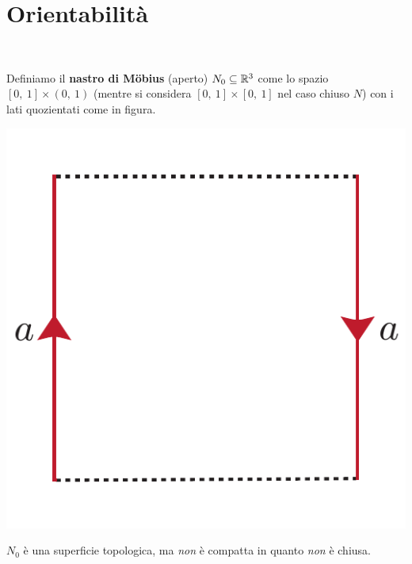 \section{Orientabilità}
\begin{define}~{}\label{nastromobius}\\
\begin{minipage}{.75\linewidth}
Definiamo il \textbf{nastro di Möbius} (aperto) $N_0\subseteq \mathbb{R}^3$ come lo spazio $\left[0,\ 1\right]\times (0,\ 1)$ (mentre si considera $\left[0,\ 1\right]\times [0,\ 1]$ nel caso chiuso $N$) con i lati quozientati come in figura.
	\end{minipage}
	\begin{minipage}{.14\linewidth}
		\begin{center}
			\includegraphics[trim=0cm 0cm 0cm 0cm, clip, scale=0.4]{images/openmoebius.pdf}
		\end{center}
	\end{minipage}
\end{define}
\begin{observe}
	$N_0$ è una superficie topologica, ma \textit{non} è compatta in quanto \textit{non} è chiusa.
	\vspace{-3mm}
\end{observe}
